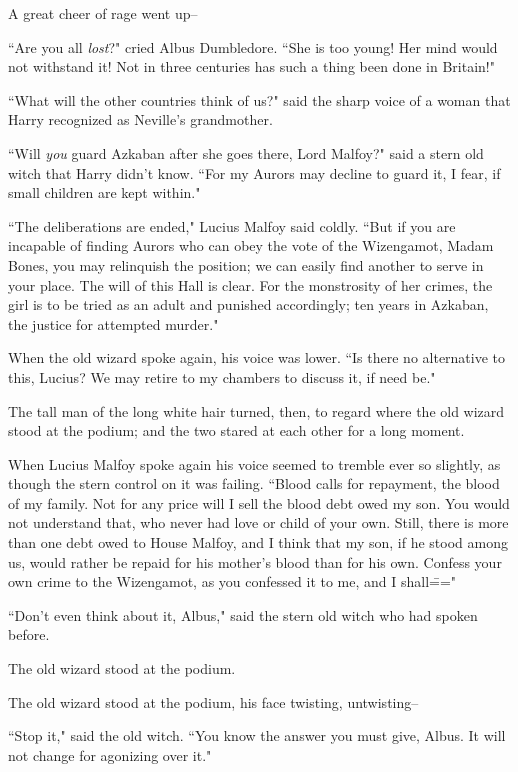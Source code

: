 A great cheer of rage went up\---

``Are you all \emph{lost}?" cried Albus Dumbledore. ``She is too young! Her mind would not withstand it! Not in three centuries has such a thing been done in Britain!"

``What will the other countries think of us?" said the sharp voice of a woman that Harry recognized as Neville's grandmother.

``Will \emph{you} guard Azkaban after she goes there, Lord Malfoy?" said a stern old witch that Harry didn't know. ``For my Aurors may decline to guard it, I fear, if small children are kept within."

``The deliberations are ended," Lucius Malfoy said coldly. ``But if you are incapable of finding Aurors who can obey the vote of the Wizengamot, Madam Bones, you may relinquish the position; we can easily find another to serve in your place. The will of this Hall is clear. For the monstrosity of her crimes, the girl is to be tried as an adult and punished accordingly; ten years in Azkaban, the justice for attempted murder."

When the old wizard spoke again, his voice was lower. ``Is there no alternative to this, Lucius? We may retire to my chambers to discuss it, if need be."

The tall man of the long white hair turned, then, to regard where the old wizard stood at the podium; and the two stared at each other for a long moment.

When Lucius Malfoy spoke again his voice seemed to tremble ever so slightly, as though the stern control on it was failing. ``Blood calls for repayment, the blood of my family. Not for any price will I sell the blood debt owed my son. You would not understand that, who never had love or child of your own. Still, there is more than one debt owed to House Malfoy, and I think that my son, if he stood among us, would rather be repaid for his mother's blood than for his own. Confess your own crime to the Wizengamot, as you confessed it to me, and I shall\==="

``Don't even think about it, Albus," said the stern old witch who had spoken before.

The old wizard stood at the podium.

The old wizard stood at the podium, his face twisting, untwisting\---

``Stop it," said the old witch. ``You know the answer you must give, Albus. It will not change for agonizing over it."

